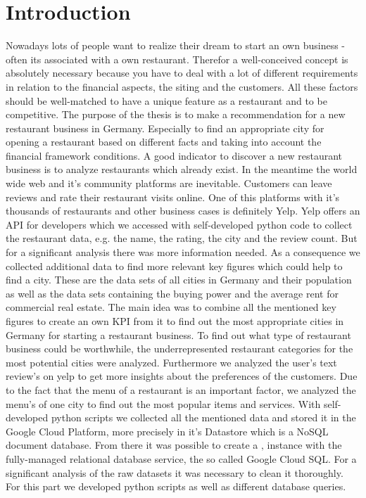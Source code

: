 \section{Introduction}
\label{sec:introduction}
Nowadays lots of people want to realize their dream to start an own business - often its associated with a own restaurant. Therefor a well-conceived concept is absolutely necessary because you have to deal with a lot of different requirements in relation to the financial aspects, the siting and the customers. All these factors should be well-matched to have a unique feature as a restaurant and to be competitive. \newline
The purpose of the thesis is to make a recommendation for a new restaurant business in Germany. Especially to find an appropriate city for opening a restaurant based on different facts and taking into account the financial framework conditions.
A good indicator to discover a new restaurant business is to analyze restaurants which already exist. In the meantime the world wide web and it's community platforms are inevitable. Customers can leave reviews and rate their restaurant visits online. One of this platforms with it's thousands of restaurants and other business cases is definitely Yelp. Yelp offers an API for developers which we accessed with self-developed python code to collect the restaurant data, e.g. the name, the rating, the city and the review count. But for a significant analysis there was more information needed. As a consequence we collected additional data to find more relevant key figures which could help to find a city. These are the data sets of all cities in Germany and their population as well as the data sets containing the buying power and the average rent for commercial real estate. The main idea was to combine all the mentioned key figures to create an own \ac{KPI} from it to find out the most appropriate cities in Germany for starting a restaurant business. To find out what type of restaurant business could be worthwhile, the underrepresented restaurant categories for the most potential cities were analyzed. Furthermore we analyzed the user's text review's on yelp to get more insights about the preferences of the customers. Due to the fact that the menu of a restaurant is an important factor, we analyzed the menu's of one city to find out the most popular items and services. With self-developed python scripts we collected all the mentioned data and stored it in the Google Cloud Platform, more precisely in it's Datastore which is a NoSQL document database. From there it was possible to create a \pg{}‚ instance with the fully-managed relational database service, the so called Google Cloud SQL. For a significant analysis of the raw datasets it was necessary to clean it thoroughly. For this part we developed python scripts as well as different database queries. \newline
